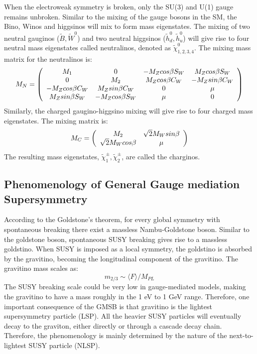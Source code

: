 \documentclass[thesis.tex]{subfiles}
\begin{document}
When the electroweak symmetry is broken, only the SU(3) and U(1) gauge remains unbroken. 
Similar to the mixing of the gauge bosons in the SM, the Bino, Winos and higgsinos will mix to form mass eigenstates.
The mixing of two neutral gauginos ($\widetilde{B}, \widetilde{W}^0$) and two neutral higgsinos ($\widetilde{h}_d^0, \widetilde{h}_u^0$) will give rise to four neutral mass eigenstates called neutralinos, denoted as $\widetilde{\chi}^0_{1,2,3,4}$. The mixing mass matrix for the neutralinos is: 
	\begin{equation}
		 M_N  = \left(
			 \begin{array}{c c c c }
			 	 M_1                           & 0                                & -M_Z cos\beta S_W & M_Z cos\beta S_W  \\
				   0                                & M_2                          & M_Zcos\beta C_W   & -M_Zsin\beta C_W  \\
				 -M_Z cos\beta C_W  & M_Z sin\beta C_W   & 0                                &  \mu \\
				 M_Z sin\beta S_W     & -M_Z cos\beta S_W  & \mu                          &  0
			\end{array}
		\right)
	\end{equation}
Similarly, the charged gaugino-higgsino mixing will give rise to four charged mass eigenstates.
The mixing matrix is: 
	\begin{equation}
		M_C = \left(
			\begin{array}{c c }
				M_2            & \sqrt{2}M_W sin\beta \\
				\sqrt{2}M_W cos\beta     &  \mu   
			\end{array}
		\right)
	\end{equation}
The resulting mass eigenstates, $\widetilde{\chi}^\pm_1, \widetilde{\chi}^\pm_2$, are called the charginos.

\subsection{Phenomenology of General Gauge mediation Supersymmetry}

According to the Goldstone's theorem, for every global symmetry with spontaneous breaking there exist a massless Nambu-Goldstone boson. 
Similar to the goldstone boson, spontaneous SUSY breaking gives rise to a massless goldstino. 
When SUSY is imposed as a local symmetry, the goldstino is absorbed by the gravitino, becoming the longitudinal component of the gravitino. 
The gravitino mass scales as:
	\begin{equation}
		m_{2/3} \sim \langle F \rangle/M_{PL}
	\end{equation}
The SUSY breaking scale could be very low in gauge-mediated models, making the gravitino to have a mass roughly in the 1 eV to 1 GeV range.  
Therefore, one important consequence of the GMSB is that gravitino is the lightest supersymmetry particle (LSP).
All the heavier SUSY particles will eventually decay to the graviton, either directly or through a cascade decay chain. 
Therefore, the phenomenology is mainly determined by the nature of the next-to-lightest SUSY particle (NLSP).\\
\end{document}
